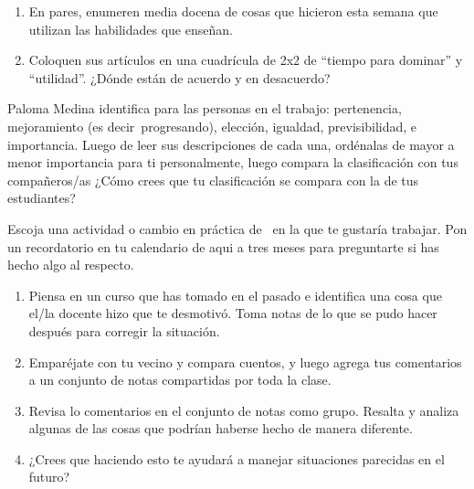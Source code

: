 

\begin{enumerate}

\item
  En pares,
  enumeren media docena de cosas que hicieron esta semana que utilizan las habilidades que enseñan.

\item
  Coloquen sus artículos en una cuadrícula de 2x2 de ``tiempo para dominar'' y ``utilidad''.
  ¿Dónde están de acuerdo y en desacuerdo?

\end{enumerate}


Paloma Medina identifica  para las personas en el trabajo:
pertenencia,
mejoramiento (es decir\ progresando),
elección,
igualdad,
previsibilidad,
e importancia.
Luego de leer sus descripciones de cada una,
ordénalas de mayor a menor importancia para ti personalmente,
luego compara la clasificación con tus compañeros/as
¿Cómo crees que tu clasificación se compara con la de tus estudiantes?


Escoja una actividad o cambio en práctica de~\cite{Lee2017} en la que te gustaría trabajar.
Pon un recordatorio en tu calendario de aqui a tres meses
para preguntarte si has hecho algo al respecto.


\begin{enumerate}

\item
  Piensa en un curso que has tomado en el pasado
  e identifica una cosa que el/la docente hizo que te desmotivó.
  Toma notas de lo que se pudo hacer después para corregir la situación.

\item
  Emparéjate con tu vecino y compara cuentos,
  y luego agrega tus comentarios a un conjunto de notas compartidas por toda la clase.

\item
  Revisa lo comentarios en el conjunto de notas como grupo.
  Resalta y analiza algunas de las cosas que podrían haberse hecho de manera diferente.

\item
  ¿Crees que haciendo esto te ayudará a manejar situaciones parecidas en el futuro?
\end{enumerate}

